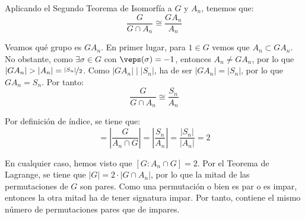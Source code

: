 \begin{ejercicio}
\begin{description}
        Aplicando el Segundo Teorema de Isomorfía a $G$ y $A_n$, tenemos que:
        \begin{equation*}
            \dfrac{G}{G\cap A_n} \cong \dfrac{GA_n}{A_n}
        \end{equation*}

        Veamos qué grupo es $GA_n$. En primer lugar, para $1\in G$ vemos que $A_n\subset GA_n$. No obstante, como $\exists \sigma\in G$ con $\veps(\sigma)=-1$, entonces $A_n\neq GA_n$, por lo que $|GA_n|>|A_n|=\nicefrac{|S_n|}{2}$. Como $|GA_n| \mid |S_n|$, ha de ser $|GA_n|=|S_n|$, por lo que $GA_n=S_n$. Por tanto:
        \begin{equation*}
            \dfrac{G}{G\cap A_n} \cong \dfrac{S_n}{A_n}
        \end{equation*}

        Por definición de índice, se tiene que:
        \begin{equation*}
            [G:A_n\cap G] = \left|\dfrac{G}{A_n\cap G}\right| = \left|\dfrac{S_n}{A_n}\right| = \dfrac{|S_n|}{|A_n|} = 2
        \end{equation*}
    \end{description}

    En cualquier caso, hemos visto que $[G:A_n\cap G]=2$. Por el Teorema de Lagrange, se tiene que $|G|=2\cdot |G\cap A_n|$, por lo que la mitad de las permutaciones de $G$ son pares. Como una permutación o bien es par o es impar, entonces la otra mitad ha de tener signatura impar. Por tanto, contiene el mismo número de permutaciones pares que de impares.
\end{ejercicio}

